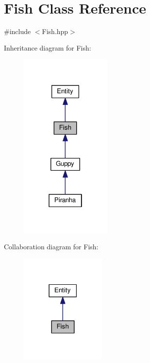\hypertarget{classFish}{}\section{Fish Class Reference}
\label{classFish}


{\ttfamily \#include $<$Fish.\+hpp$>$}



Inheritance diagram for Fish\+:
\nopagebreak
\begin{figure}[H]
\begin{center}
\leavevmode
\includegraphics[width=130pt]{classFish__inherit__graph}
\end{center}
\end{figure}


Collaboration diagram for Fish\+:
\nopagebreak
\begin{figure}[H]
\begin{center}
\leavevmode
\includegraphics[width=122pt]{classFish__coll__graph}
\end{center}
\end{figure}
